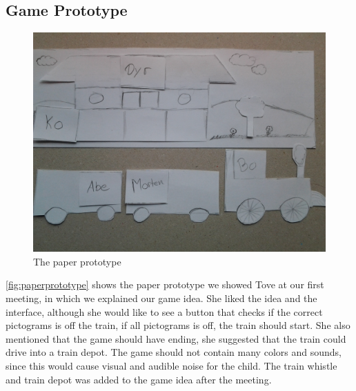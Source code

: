 \subsection{Game Prototype}
\begin{figure}[H]
\centering
\includegraphics[width=0.9\linewidth]{img/screenshots/prototype1.jpg}%
\caption{The paper prototype}
\label{fig:paperprototype}
\end{figure}
\autoref{fig:paperprototype} shows the paper prototype we showed Tove at our first meeting, in which we explained our game idea. She liked the idea and the interface, although she would like to see a button that checks if the correct pictograms is off the train, if all pictograms is off, the train should start. She also mentioned that the game should have ending, she suggested that the train could drive into a train depot. The game should not contain many colors and sounds, since this would cause visual and audible noise for the child. The train whistle and train depot was added to the game idea after the meeting.


